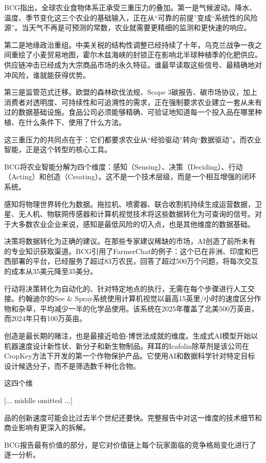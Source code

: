 \documentclass[11pt]{ctexart}
\begin{document}
BCG指出，全球农业食物体系正承受三重压力的叠加。第一是气候波动。降水、温度、季节变化这三个农业的基础输入，正在从“可靠的前提”变成“系统性的风险源”。当天气不再是可预测的常数，农业就需要更精细的监测和更快速的响应。

第二是地缘政治重组。中美关税的结构性调整已经持续了十年，乌克兰战争一夜之间重绘了小麦贸易地图，霍尔木兹海峡的封锁正在影响北半球种植季的化肥供应。供应链冲击已经成为大宗商品市场的永久特征。谁最早读取这些信号、最精确地对冲风险，谁就能获得优势。

第三是监管范式迁移。欧盟的森林砍伐法规、Scope 3碳报告、碳市场协议，加上消费者对透明度、可持续性和可追溯性的需求，正在强制要求农业建立一套从未有过的数据基础设施。食品公司必须能够精确、可验证地知道每一个投入品在哪里种植、在什么条件下、使用了什么方法。

这三重压力的共同点在于：它们都要求农业从“经验驱动”转向“数据驱动”。而农业智能，正是这个转型的核心工具。

BCG将农业智能分解为四个维度：感知（Sensing）、决策（Deciding）、行动（Acting）和创造（Creating）。这不是一个技术层级，而是一个相互增强的闭环系统。

感知将物理世界转化为数据。拖拉机、喷雾器、联合收割机持续生成运营数据，卫星、无人机、物联网传感器和计算机视觉技术将这些数据转化为可查询的信号。对于大多数农业企业来说，感知是最低风险的切入点，也是其他维度的数据基础。

决策将数据转化为正确的建议。在那些专家建议稀缺的市场，AI创造了前所未有的专业知识获取渠道。BCG引用了FarmerChat的例子：这个已在非洲、印度和巴西部署的平台，已经服务了超过83万农民，回答了超过500万个问题，将每次交互的成本从35美元降至35美分。

行动将决策转化为自动化的、针对特定地点的执行，无需在每个步骤进行人工交接。约翰迪尔的See \& Spray系统使用计算机视觉以最高15英里/小时的速度区分作物和杂草，平均减少一半的化学品使用。该系统在2025年覆盖了北美500万英亩，而2024年只有100万英亩。

创造是最长期的赌注，也是最接近哈伯-博世法成就的维度。生成式AI模型开始以机器速度设计新性状、新分子和新生物制品。拜耳的Icafolin除草剂是该公司在CropKey方法下开发的第一个作物保护产品。它使用AI和数据科学针对特定目标设计候选分子，而不是筛选数千种化合物。

这四个维

[... middle omitted ...]

品的创新速度可能会比过去半个世纪还要快。完整报告中对这一维度的技术细节和商业影响有更深入的拆解。

BCG报告最有价值的部分，是它对价值链上每个玩家面临的竞争格局变化进行了逐一分析。
\end{document}
